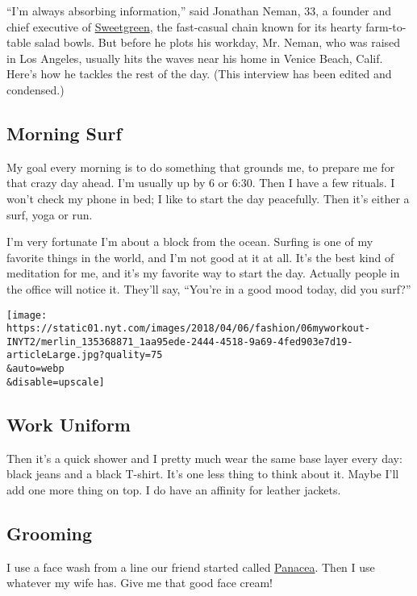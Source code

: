 ``I'm always absorbing information,'' said Jonathan Neman, 33, a founder
and chief executive of \href{http://www.sweetgreen.com/}{Sweetgreen},
the fast-casual chain known for its hearty farm-to-table salad bowls.
But before he plots his workday, Mr. Neman, who was raised in Los
Angeles, usually hits the waves near his home in Venice Beach, Calif.
Here's how he tackles the rest of the day. (This interview has been
edited and condensed.)

\hypertarget{morning-surf}{%
\subsection{Morning Surf}\label{morning-surf}}

My goal every morning is to do something that grounds me, to prepare me
for that crazy day ahead. I'm usually up by 6 or 6:30. Then I have a few
rituals. I won't check my phone in bed; I like to start the day
peacefully. Then it's either a surf, yoga or run.

I'm very fortunate I'm about a block from the ocean. Surfing is one of
my favorite things in the world, and I'm not good at it at all. It's the
best kind of meditation for me, and it's my favorite way to start the
day. Actually people in the office will notice it. They'll say, ``You're
in a good mood today, did you surf?''

\texttt{[image: https://static01.nyt.com/images/2018/04/06/fashion/06myworkout-INYT2/merlin\_135368871\_1aa95ede-2444-4518-9a69-4fed903e7d19-articleLarge.jpg?quality=75\\\&auto=webp\\\&disable=upscale]}

\hypertarget{work-uniform}{%
\subsection{Work Uniform}\label{work-uniform}}

Then it's a quick shower and I pretty much wear the same base layer
every day: black jeans and a black T-shirt. It's one less thing to think
about it. Maybe I'll add one more thing on top. I do have an affinity
for leather jackets.

\hypertarget{grooming}{%
\subsection{Grooming}\label{grooming}}

I use a face wash from a line our friend started called
\href{https://www.thepanacea.com/}{Panacea}. Then I use whatever my wife
has. Give me that good face cream!

